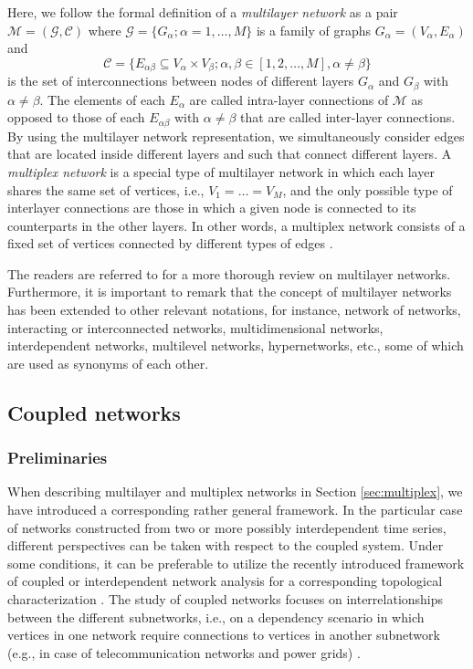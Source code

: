 			Here, we follow the formal definition of a {\textit{multilayer network}} \cite{Boccaletti2014} as a pair $\mathcal{M} = (\mathcal{G}, \mathcal{C})$ where $\mathcal{G} = \{G_{\alpha}; \alpha=1, \dots, M\}$ is a family of graphs $G_{\alpha} = (V_{\alpha}, E_{\alpha})$ and 
		\begin{equation}
		\mathcal{C} = \{ E_{\alpha\beta} \subseteq V_{\alpha} \times V_{\beta}; \alpha, \beta \in [1, 2, \dots, M], \alpha \neq \beta \}
		\end{equation}
		is the set of interconnections between nodes of different layers $G_{\alpha}$ and $G_{\beta}$ with $\alpha \neq \beta$. The elements of each $E_{\alpha}$ are called intra-layer connections of $\mathcal{M}$ as opposed to those of each $E_{\alpha\beta}$ with $\alpha\neq\beta$ that are called inter-layer connections. By using the multilayer network representation, we simultaneously consider edges that are located inside different layers and such that connect different layers. A {\textit{multiplex network}} is a special type of multilayer network in which each layer shares the same set of vertices, i.e., $V_{1} = \dots = V_M$, and the only possible type of interlayer connections are those in which a given node is connected to its counterparts in the other layers.  In other words, a multiplex network consists of a fixed set of vertices connected by different types of edges \cite{Boccaletti2014}. 
		
			The readers are referred to \cite{Boccaletti2014,Buldyrev2010} for a more thorough review on multilayer networks. Furthermore, it is important to remark that the concept of multilayer networks has been extended to other relevant notations, for instance, network of networks, interacting or interconnected networks, multidimensional networks, interdependent networks, multilevel networks, hypernetworks, etc., some of which are used as synonyms of each other. 	
	
		\subsection{Coupled networks}\label{sec:irn_measures}
	    		
                \subsubsection{Preliminaries}
			When describing multilayer and multiplex networks in Section \ref{sec:multiplex}, we have introduced a corresponding rather general framework. In the particular case of networks constructed from two or more possibly interdependent time series, different perspectives can be taken with respect to the coupled system. Under some conditions, it can be preferable to utilize the recently introduced framework of coupled or interdependent network analysis for a corresponding topological characterization \cite{Donges2011b,Wiedermann2013}. The study of coupled networks focuses on interrelationships between the different subnetworks, i.e., on a dependency scenario in which vertices in one network require connections to vertices in another subnetwork (e.g., in case of telecommunication networks and power grids) \cite{Buldyrev2010}. 
			
